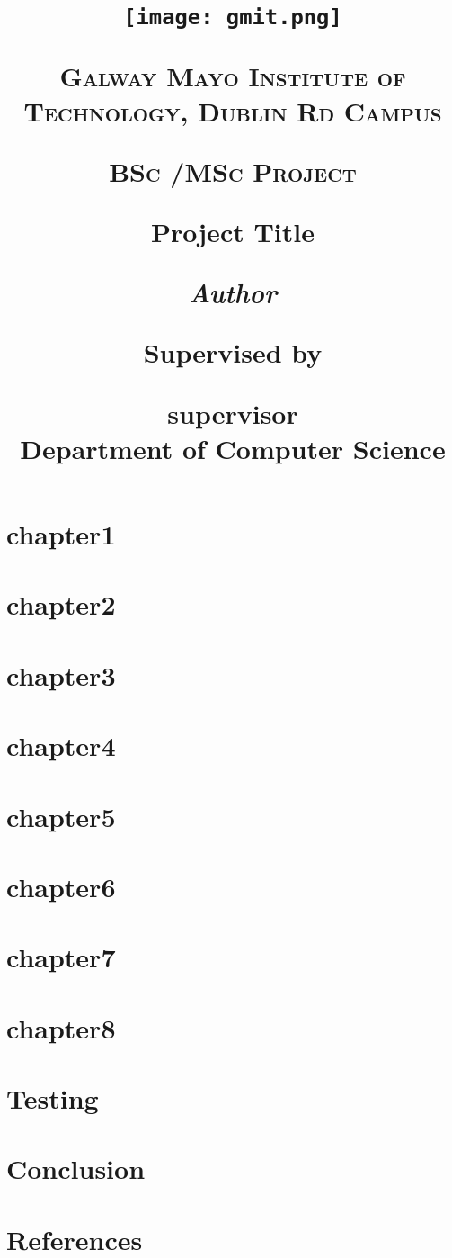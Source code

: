 \documentclass[11pt,twoside]{report}
\title{



{\texttt{[image: gmit.png]}}


        \vspace{0.25cm}
        {\scshape\LARGE Galway Mayo Institute of Technology, Dublin Rd Campus \par}
        \vspace{0.25cm}
        {\scshape\Large BSc  /MSc Project \par}
        \vspace{0.5cm}

        {\Large\bfseries Project Title\par}
        
        \vspace{0.5cm}
        {\Large\itshape Author \par}
        \vspace{0.25cm}

\vspace{1cm}
Supervised by\par
supervisor  \\
Department of Computer Science \par
\vspace{1.5cm}
\large
}
\begin{document}
\maketitle 


\tableofcontents
\chapter{chapter1}


\chapter{chapter2 }


\chapter{chapter3}


\chapter{chapter4}


\chapter{chapter5}


\chapter{chapter6}


\chapter{chapter7}


\chapter{chapter8}


\chapter{Testing}


\chapter{Conclusion}


\chapter{References}

\end{document}
